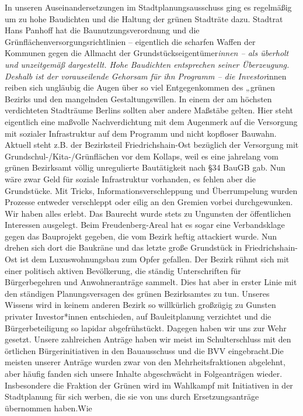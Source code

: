 \documentclass[a4paper,10pt]{article}
\begin{document}
In unseren Auseinandersetzungen im Stadtplanungsausschuss ging es
regelmäßig um zu hohe Baudichten und die Haltung der grünen Stadträte
dazu. Stadtrat Hans Panhoff hat die Baunutzungsverordnung und die
Grünflächenversorgungsrichtlinien -- eigentlich die scharfen Waffen der
Kommunen gegen die Allmacht der Grundstückseigentümer\emph{innen -- als
überholt und unzeitgemäß dargestellt. Hohe Baudichten entsprechen seiner
Überzeugung. Deshalb ist der vorauseilende Gehorsam für ihn Programm --
die Investor}innen reiben sich ungläubig die Augen über so viel
Entgegenkommen des „grünen{\grqq} Bezirks und den mangelnden
Gestaltungswillen. In einem der am höchsten verdichteten Stadträume
Berlins sollten aber andere Maßstäbe gelten. Hier steht eigentlich eine
maßvolle Nachverdichtung mit dem Augenmerk auf die Versorgung mit
sozialer Infrastruktur auf dem Programm und nicht kopfloser Bauwahn.
Aktuell steht z.B. der Bezirksteil Friedrichshain-Ost bezüglich der
Versorgung mit Grundschul-/Kita-/Grünflächen vor dem Kollaps, weil es
eine jahrelang vom grünen Bezirksamt völlig unregulierte Bautätigkeit
nach §34 BauGB gab. Nun wäre zwar Geld für soziale Infrastruktur
vorhanden, es fehlen aber die Grundstücke. Mit Tricks,
Informationsverschleppung und Überrumpelung wurden Prozesse entweder
verschleppt oder eilig an den Gremien vorbei durchgewunken. Wir haben
alles erlebt. Das Baurecht wurde stets zu Ungunsten der öffentlichen
Interessen ausgelegt. Beim Freudenberg-Areal hat es sogar eine
Verbandsklage gegen das Bauprojekt gegeben, die vom Bezirk heftig
attackiert wurde. Nun drehen sich dort die Baukräne und das letzte große
Grundstück in Friedrichshain-Ost ist dem Luxuswohnungsbau zum Opfer
gefallen. Der Bezirk rühmt sich mit einer politisch aktiven Bevölkerung,
die ständig Unterschriften für Bürgerbegehren und Anwohneranträge
sammelt. Dies hat aber in erster Linie mit den ständigen
Planungsversagen des grünen Bezirksamtes zu tun. Unseres Wissens wird in
keinem anderen Bezirk so willkürlich großzügig zu Gunsten privater
Investor*innen entschieden, auf Bauleitplanung verzichtet und die
Bürgerbeteiligung so lapidar abgefrühstückt. Dagegen haben wir uns zur
Wehr gesetzt. Unsere zahlreichen Anträge haben wir meist im
Schulterschluss mit den örtlichen Bürgerinitiativen in den Bauausschuss
und die BVV eingebracht.Die meisten unserer Anträge wurden zwar von den
Mehrheitsfraktionen abgelehnt, aber häufig fanden sich unsere Inhalte
abgeschwächt in Folgeanträgen wieder. Insbesondere die Fraktion der
Grünen wird im Wahlkampf mit Initiativen in der Stadtplanung für sich
werben, die sie von uns durch Ersetzungsanträge übernommen haben.Wie
\end{document}
